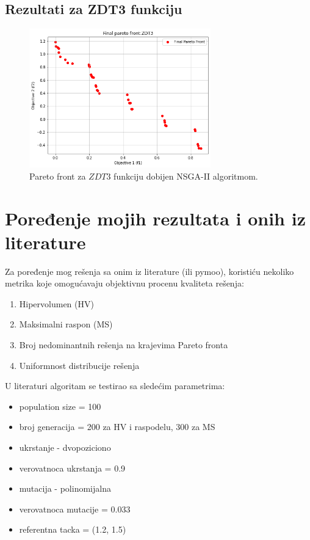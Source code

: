 \documentclass[12pt]{article}
\begin{document}
\subsection{Rezultati za ZDT3 funkciju}
\begin{figure}[H]
    \centering
    \includegraphics[width=0.7\textwidth]{images/zdt3.png}
    \caption{Pareto front za \( ZDT3 \) funkciju dobijen NSGA-II algoritmom.}
    \label{fig:zdt3_results}
\end{figure}

\section{Poređenje mojih rezultata i onih iz literature}
Za poređenje mog rešenja sa onim iz literature (ili pymoo), koristiću nekoliko metrika koje omogućavaju objektivnu procenu kvaliteta rešenja:
\cite{gete-plots}
\begin{enumerate} 
	\item {Hipervolumen (HV)} 
	\item {Maksimalni raspon (MS)} 
	\item {Broj nedominantnih rešenja na krajevima Pareto fronta} 
	\item {Uniformnost distribucije rešenja} 
\end{enumerate}

U literaturi \cite{gete-plots} algoritam se testirao sa sledećim parametrima:
\begin{itemize}
\item population size = 100
\item broj generacija = 200 za HV i raspodelu, 300 za MS
\item ukrstanje - dvopoziciono
\item verovatnoca ukrstanja = 0.9
\item mutacija - polinomijalna
\item verovatnoca mutacije = 0.033
\item referentna tacka = (1.2, 1.5)
\end{itemize}
\end{document}
